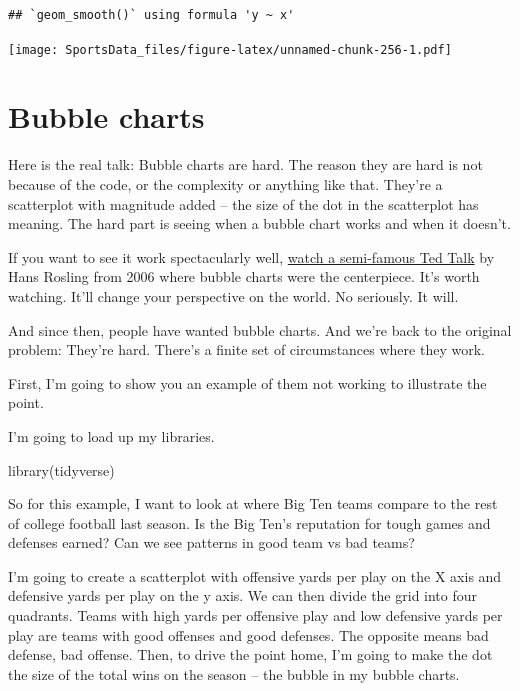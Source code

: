 \documentclass[
]{book}
\newenvironment{Shaded}{\begin{snugshade}}{\end{snugshade}}
\newcommand{\FunctionTok}[1]{\textcolor[rgb]{0.00,0.00,0.00}{#1}}
\newcommand{\NormalTok}[1]{#1}
\begin{document}
\begin{verbatim}
## `geom_smooth()` using formula 'y ~ x'
\end{verbatim}

\texttt{[image: SportsData\_files/figure-latex/unnamed-chunk-256-1.pdf]}

\hypertarget{bubble-charts}{%
\chapter{Bubble charts}\label{bubble-charts}}

Here is the real talk: Bubble charts are hard. The reason they are hard is not because of the code, or the complexity or anything like that. They're a scatterplot with magnitude added -- the size of the dot in the scatterplot has meaning. The hard part is seeing when a bubble chart works and when it doesn't.

If you want to see it work spectacularly well, \href{https://www.youtube.com/watch?v=hVimVzgtD6w}{watch a semi-famous Ted Talk} by Hans Rosling from 2006 where bubble charts were the centerpiece. It's worth watching. It'll change your perspective on the world. No seriously. It will.

And since then, people have wanted bubble charts. And we're back to the original problem: They're hard. There's a finite set of circumstances where they work.

First, I'm going to show you an example of them not working to illustrate the point.

I'm going to load up my libraries.

\begin{Shaded}
\begin{Highlighting}[]
\FunctionTok{library}\NormalTok{(tidyverse)}
\end{Highlighting}
\end{Shaded}

So for this example, I want to look at where Big Ten teams compare to the rest of college football last season. Is the Big Ten's reputation for tough games and defenses earned? Can we see patterns in good team vs bad teams?

I'm going to create a scatterplot with offensive yards per play on the X axis and defensive yards per play on the y axis. We can then divide the grid into four quadrants. Teams with high yards per offensive play and low defensive yards per play are teams with good offenses and good defenses. The opposite means bad defense, bad offense. Then, to drive the point home, I'm going to make the dot the size of the total wins on the season -- the bubble in my bubble charts.
\end{document}
